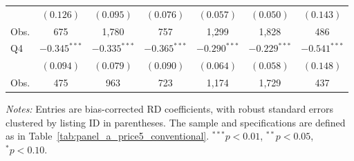 \begin{table}[!htbp]
\begin{tabular}{lcccccc}
       & $(0.126)$ & $(0.095)$ & $(0.076)$ & $(0.057)$ & $(0.050)$ & $(0.143)$ \\
Obs.   & 675 & 1,780 & 757 & 1,299 & 1,828 & 486 \\
\addlinespace[2pt]
Q4     & $-0.345^{***}$ & $-0.335^{***}$ & $-0.365^{***}$ & $-0.290^{***}$ & $-0.229^{***}$ & $-0.541^{***}$ \\
       & $(0.094)$ & $(0.079)$ & $(0.090)$ & $(0.064)$ & $(0.058)$ & $(0.148)$ \\
Obs.   & 475 & 963 & 723 & 1,174 & 1,729 & 437 \\
\hline\hline
\end{tabular}

\vspace{2pt}
\parbox{0.96\textwidth}{\footnotesize
\textit{Notes:} Entries are bias-corrected RD coefficients, with robust standard
errors clustered by listing ID in parentheses. The sample and specifications are
defined as in Table~\ref{tab:panel_a_price5_conventional}. $^{***}p<0.01$,
$^{**}p<0.05$, $^{*}p<0.10$.}
\end{table}
